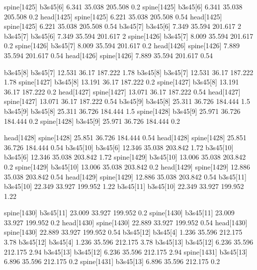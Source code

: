 spine[1425]    b3s45[6]    6.341    35.038    205.508    0.2
spine[1425]    b3s45[6]    6.341    35.038    205.508    0.2
head[1425]    spine[1425]    6.221    35.038    205.508    0.54
head[1425]    spine[1425]    6.221    35.038    205.508    0.54
b3s45[7]    b3s45[6]    7.349    35.594    201.617    2
b3s45[7]    b3s45[6]    7.349    35.594    201.617    2
spine[1426]    b3s45[7]    8.009    35.594    201.617    0.2
spine[1426]    b3s45[7]    8.009    35.594    201.617    0.2
head[1426]    spine[1426]    7.889    35.594    201.617    0.54
head[1426]    spine[1426]    7.889    35.594    201.617    0.54


b3s45[8]    b3s45[7]    12.531    36.17    187.222    1.78
b3s45[8]    b3s45[7]    12.531    36.17    187.222    1.78
spine[1427]    b3s45[8]    13.191    36.17    187.222    0.2
spine[1427]    b3s45[8]    13.191    36.17    187.222    0.2
head[1427]    spine[1427]    13.071    36.17    187.222    0.54
head[1427]    spine[1427]    13.071    36.17    187.222    0.54
b3s45[9]    b3s45[8]    25.311    36.726    184.444    1.5
b3s45[9]    b3s45[8]    25.311    36.726    184.444    1.5
spine[1428]    b3s45[9]    25.971    36.726    184.444    0.2
spine[1428]    b3s45[9]    25.971    36.726    184.444    0.2


head[1428]    spine[1428]    25.851    36.726    184.444    0.54
head[1428]    spine[1428]    25.851    36.726    184.444    0.54
b3s45[10]    b3s45[6]    12.346    35.038    203.842    1.72
b3s45[10]    b3s45[6]    12.346    35.038    203.842    1.72
spine[1429]    b3s45[10]    13.006    35.038    203.842    0.2
spine[1429]    b3s45[10]    13.006    35.038    203.842    0.2
head[1429]    spine[1429]    12.886    35.038    203.842    0.54
head[1429]    spine[1429]    12.886    35.038    203.842    0.54
b3s45[11]    b3s45[10]    22.349    33.927    199.952    1.22
b3s45[11]    b3s45[10]    22.349    33.927    199.952    1.22


spine[1430]    b3s45[11]    23.009    33.927    199.952    0.2
spine[1430]    b3s45[11]    23.009    33.927    199.952    0.2
head[1430]    spine[1430]    22.889    33.927    199.952    0.54
head[1430]    spine[1430]    22.889    33.927    199.952    0.54
b3s45[12]    b3s45[4]    1.236    35.596    212.175    3.78
b3s45[12]    b3s45[4]    1.236    35.596    212.175    3.78
b3s45[13]    b3s45[12]    6.236    35.596    212.175    2.94
b3s45[13]    b3s45[12]    6.236    35.596    212.175    2.94
spine[1431]    b3s45[13]    6.896    35.596    212.175    0.2
spine[1431]    b3s45[13]    6.896    35.596    212.175    0.2


